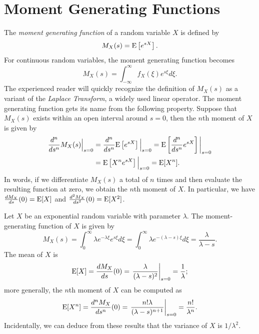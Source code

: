 \fi

\section{Moment Generating Functions}

The \emph{moment generating function} of a random variable $X$ is defined by
\begin{equation*}
M_X (s) = \mathrm{E} \left[ e^{s X} \right] .
\end{equation*}
For continuous random variables, the moment generating function becomes
\begin{equation*}
M_X (s) = \int_{-\infty}^{\infty} f_X (\xi) e^{s \xi} d\xi .
\end{equation*}
The experienced reader will quickly recognize the definition of $M_X(s)$ as a variant of the \emph{Laplace Transform}, a widely used linear operator.
The moment generating function gets its name from the following property.
Suppose that $M_X(s)$ exists within an open interval around $s = 0$, then the $n$th moment of $X$ is given by
\begin{equation*}
\begin{split}
\frac{d^n}{ds^n} M_X (s) \Big|_{s=0}
&= \frac{d^n}{ds^n} \mathrm{E} \left[ e^{s X} \right] \Big|_{s=0}
= \mathrm{E} \left[ \frac{d^n}{ds^n} e^{s X} \right] \bigg|_{s=0} \\
&= \mathrm{E} \left[ X^n e^{s X} \right] \Big|_{s=0}
= \mathrm{E} [X^n] .
\end{split}
\end{equation*}
In words, if we differentiate $M_X(s)$ a total of $n$ times and then evaluate the resulting function at zero, we obtain the $n$th moment of $X$.
In particular, we have $\frac{d M_X}{ds}(0) = \mathrm{E} [X]$ and $\frac{d^2 M_X}{ds^2}(0) = \mathrm{E} [X^2]$.

\begin{example}
Let $X$ be an exponential random variable with parameter $\lambda$.
The moment-generating function of $X$ is given by
\begin{equation*}
M_X (s) = \int_0^{\infty} \lambda e^{-\lambda \xi} e^{s\xi} d\xi
= \int_0^{\infty} \lambda e^{-(\lambda-s) \xi} d\xi
= \frac{\lambda}{\lambda - s} .
\end{equation*}
The mean of $X$ is
\begin{equation*}
\mathrm{E} [X] = \frac{d M_X }{ds} (0)
= \left. \frac{\lambda}{(\lambda - s)^2} \right|_{s=0}
= \frac{1}{\lambda} ;
\end{equation*}
more generally, the $n$th moment of $X$ can be computed as
\begin{equation*}
\mathrm{E} [X^n] = \frac{d^n M_X }{ds^n} (0)
= \left. \frac{n! \lambda}{(\lambda - s)^{n+1}} \right|_{s=0}
= \frac{n!}{\lambda^n} .
\end{equation*}
Incidentally, we can deduce from these results that the variance of $X$ is $1/\lambda^2$.
\end{example}

